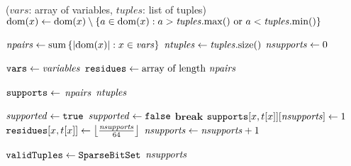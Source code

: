       \PROCEDURE \InitialiseCT($vars$: array of variables,
      $tuples$: list of tuples)
       \label{line:init:-1} %
        \STATE $\text{dom}({x}) \leftarrow \text{dom}({x}) \setminus  
        \left\{a \in \text{dom}({x}) : a > \mathit{tuples}.\mathrm{max}()
          ~\text{or}~a < \mathit{tuples}.\mathrm{min}()\right\}$
          \RETURN{} \label{line:init:wipeout0}
          \ENDIF
       \ENDFOREACH \label{line:init:0}

      \STATE $\mathit{npairs} \leftarrow \mathrm{sum}\left\{|\text{dom}({x})| : x \in \mathit{vars}\right\}$
      \label{line:init:3}
      \STATE $\mathit{ntuples} \leftarrow \mathit{tuples}.\mathrm{size}()$ 
      \STATE $\mathit{nsupports} \leftarrow 0$  \label{line:init:4}
      
      \STATE $\texttt{vars} \leftarrow \mathit{variables}$ \label{line:init:1}
      \STATE $\texttt{residues} \leftarrow \text{array of length~} \mathit{npairs}$ \label{line:init:residue}
      
      \STATE $\texttt{supports} \leftarrow$ $\mathit{npairs}$
      $\mathit{ntuples}$ \label{line:init:5}

       \label{line:init:6}
        \STATE $\mathit{supported} \leftarrow \texttt{true}$
            \STATE $\mathit{supported} \leftarrow \texttt{false}$
            \STATE $\textbf{break}$ 
          \ENDIF
        \ENDFOREACH
             \label{line:init:9}
              \STATE $\texttt{supports}[x,t[x]][\mathit{nsupports}] \leftarrow 1$ \label{line:init:10}
              \STATE $\texttt{residues}[x,t[x]] \leftarrow \left\lfloor\frac{\mathit{nsupports}}{64}\right\rfloor$
              \label{line:init:11}
              \STATE $\mathit{nsupports} \leftarrow \mathit{nsupports} + 1$
            \ENDFOREACH
          \ENDIF
      \ENDFOREACH \label{line:init:7}

       \label{line:init:12}
          \label{line:init:14}
          \RETURN{} \label{line:init:wipeout}
          \ENDIF
          
      \ENDFOREACH
      \STATE $\texttt{validTuples} \leftarrow \texttt{SparseBitSet}$  $\mathit{nsupports}$  \label{line:init:15}
